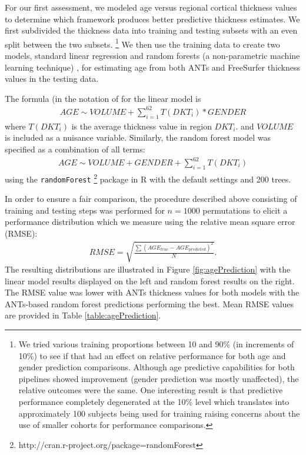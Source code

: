 For our first assessment, we modeled age versus regional cortical thickness values 
to determine which framework produces better predictive thickness estimates.  We first
subdivided the thickness data into training and testing subsets with an even split
between the two subsets.%
\footnote{
We tried various training proportions between 10 and 90\% (in increments of 10\%)
to see if that had an effect on relative performance for both age and 
gender prediction comparisons. Although age predictive capabilities for 
both pipelines showed improvement (gender prediction was mostly unaffected), 
the relative outcomes were the same.  
One interesting result
is that predictive performance completely degenerated at the 10\% level
which translates into approximately 100 subjects being used for training
raising concerns about the use of smaller cohorts for performance comparisons.
}
We then use the training data to create two models, standard linear regression
and random forests (a non-parametric machine learning technique) \cite{breiman2001},
for estimating age from both ANTs and FreeSurfer thickness values in the testing data.  

The formula (in the notation of \cite{wilkinson1973} for the linear model is
\begin{align}
  AGE \sim VOLUME + \sum_{i=1}^{62} T(DKT_{i})*GENDER
\end{align}
where $T(DKT_{i})$ is the average thickness value in region $DKT_{i}$.
and $VOLUME$ is included as a nuisance variable.  Similarly, the random forest 
model was specified as a combination of all terms: 
\begin{align}
  AGE \sim VOLUME + GENDER + \sum_{i=1}^{62} T(DKT_{i})
\end{align}
using the {\tt randomForest}%
\footnote{
http://cran.r-project.org/package=randomForest
}
package in R with the default settings and 200 trees.

In order to ensure a fair comparison, the procedure described above consisting
of training and testing steps was performed for $n = 1000$ permutations to elicit a 
performance distribution which we measure using the relative mean square
error (RMSE):
\begin{align}
  RMSE = \sqrt{\frac{\sum \left(AGE_{true} - AGE_{predicted} \right)^2}{N}}.
\end{align}
The resulting distributions are illustrated in Figure \ref{fig:agePrediction}
with the linear model results displayed on the left and random forest results
on the right.  The RMSE value was lower with ANTs thickness values for both 
models with the ANTs-based random forest predictions performing the best.  
Mean RMSE values are provided in Table \ref{table:agePrediction}.

